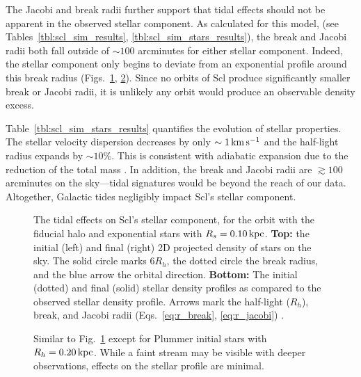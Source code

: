 The Jacobi and break radii further support that tidal effects should not
be apparent in the observed stellar component. As calculated for this
model, (see
Tables~\ref{tbl:scl_sim_results}, \ref{tbl:scl_sim_stars_results}), the
break and Jacobi radii both fall outside of \(\sim 100\) arcminutes for
either stellar component. Indeed, the stellar component only begins to
deviate from an exponential profile around this break radius
(Figs.~\ref{fig:scl_smallperi_i_f}, \ref{fig:scl_smallperi_plummer_i_f}).
Since no orbits of Scl produce significantly smaller break or Jacobi
radii, it is unlikely any orbit would produce an observable density
excess.

Table~\ref{tbl:scl_sim_stars_results} quantifies the evolution of
stellar properties. The stellar velocity dispersion decreases by only
\(\sim1\,{\rm km\,s^{-1}}\) and the half-light radius expands by \(\sim 10\%\). This
is consistent with adiabatic expansion due to the reduction of the total
mass \citep[e.g.,][]{stucker+2023}. In addition, the break and Jacobi
radii are \(\gtrsim 100\) arcminutes on the sky---tidal signatures would
be beyond the reach of our data. Altogether, Galactic tides negligibly
impact Scl's stellar component.

\begin{figure}
\centering
{}
\caption[Sculptor initial and final density profiles]{The tidal effects
on Scl's stellar component, for the \smallperi{} orbit with the fiducial
halo and exponential stars with \(R_s=0.10\,{\rm kpc}\). \textbf{Top:} the
initial (left) and final (right) 2D projected density of stars on the
sky. The solid circle marks \(6R_h\), the dotted circle the break
radius, and the blue arrow the orbital direction. \textbf{Bottom:} The
initial (dotted) and final (solid) stellar density profiles as compared
to the observed stellar density profile. Arrows mark the half-light
(\(R_h\)), break, and Jacobi radii
(Eqs.~\ref{eq:r_break}, \ref{eq:r_jacobi})
.}\label{fig:scl_smallperi_i_f}
\end{figure}

\begin{figure}
\centering
{}
\caption[Sculptor Plummer initial and final density profiles]{Similar to
Fig.~\ref{fig:scl_smallperi_i_f} except for Plummer initial stars with
\(R_h = 0.20\,{\rm kpc}\). While a faint stream may be visible with deeper
observations, effects on the stellar profile are
minimal.}\label{fig:scl_smallperi_plummer_i_f}
\end{figure}

